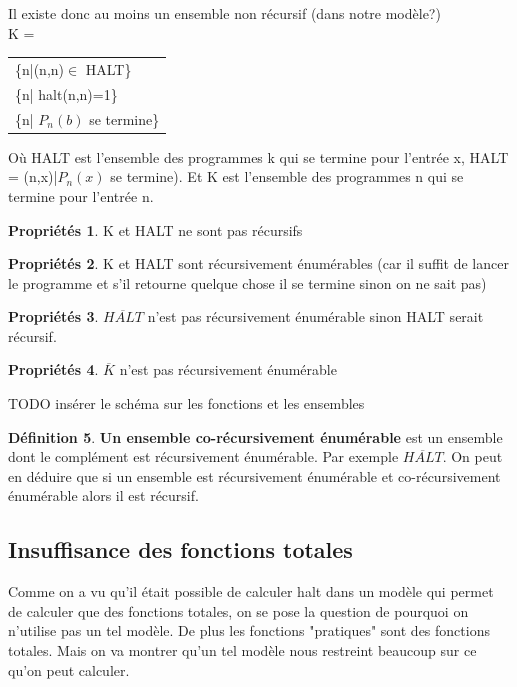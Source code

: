 \documentclass[11pt,a4paper]{article}
\newcommand{\stcomp}[1]{\overline{#1}}
\theoremstyle{definition}
\newtheorem{mydef}{Définition}
\newtheorem{myprop}[mydef]{Propriétés}
\begin{document}
Il existe donc au moins un ensemble non récursif (dans notre 
modèle?)\\
K = 
\begin{tabular}{l}
	\{n|(n,n)$\in$ HALT\}\\
	\{n| halt(n,n)=1\}\\
	\{n| $P_n(b)$ se termine\} \\
\end{tabular}

Où HALT est l'ensemble des programmes k qui se termine pour l'entrée x, 
HALT = {(n,x)|$P_n(x)$ se termine}). Et K est l'ensemble des programmes n qui
se termine pour l'entrée n.

\begin{myprop}
	K et HALT ne sont pas récursifs
\end{myprop}
	
\begin{myprop}
	K et HALT sont récursivement énumérables (car il suffit de lancer le 
	programme et s’il retourne quelque chose il se termine sinon on ne sait 
	pas)
\end{myprop}
	
\begin{myprop}
	$\stcomp{HALT}$ n'est pas récursivement énumérable sinon HALT 
		serait récursif.
\end{myprop}
	
\begin{myprop}
	$\stcomp{K}$ n'est pas récursivement énumérable
\end{myprop}
	

TODO insérer le schéma sur les fonctions et les ensembles

\begin{mydef}
	\textbf{Un ensemble co-récursivement énumérable} est un ensemble dont le 
	complément est récursivement énumérable. Par exemple $\stcomp{HALT}$. On peut 
	en déduire que si un ensemble est récursivement énumérable et co-récursivement 
	énumérable alors il est récursif.
\end{mydef}


\subsection{Insuffisance des fonctions totales}
\label{sub:insuffisance_des_fonctions_totales}
Comme on a vu qu'il était possible de calculer halt dans un modèle qui
permet de calculer que des fonctions totales, on se pose la question de 
pourquoi on n'utilise pas un tel modèle. De plus les fonctions "pratiques" sont 
des fonctions totales. Mais on va montrer qu'un tel modèle nous restreint 
beaucoup sur ce qu'on peut calculer.
\end{document}
